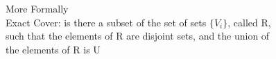 \documentclass[preview]{standalone}
\begin{document}
\begin{center}
More Formally \\ Exact Cover: is there a subset of the set of sets $\{V_i\}$, called R, \\such that the elements of R are disjoint sets, and the union of \\the elements of R is U
\end{center}
\end{document}
